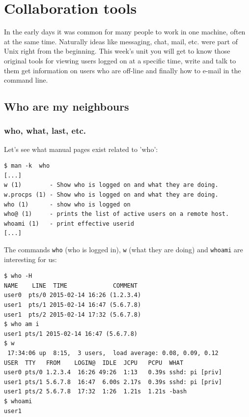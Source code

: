 \documentclass[11pt,a4paper,twoside]{article}
\begin{document}
\newpage

\section{Collaboration tools}

In the early days it was common for many people to work in one machine, 
often at the same time. Naturally ideas like messaging, chat, mail, etc. 
were part of Unix right from the beginning. This week's unit you will get 
to know those original tools for viewing users logged on at a specific
time, write and talk to them get information on users who are off-line
and finally how to e-mail in the command line.


\subsection{Who are my neighbours}

\subsubsection{who, what, last, etc.}

Let's see what manual pages exist related to 'who':

\begin{lstlisting}[frame=single]
$ man -k  who
[...]
w (1)        - Show who is logged on and what they are doing.
w.procps (1) - Show who is logged on and what they are doing.
who (1)      - show who is logged on
who@ (1)     - prints the list of active users on a remote host.
whoami (1)   - print effective userid
[...]
\end{lstlisting}

The commands \texttt{who} (who is logged in), \texttt{w} (what they are
doing) and \texttt{whoami} are interesting for us:

\begin{lstlisting}[frame=single]
$ who -H
NAME    LINE  TIME             COMMENT
user0  pts/0 2015-02-14 16:26 (1.2.3.4)
user1  pts/1 2015-02-14 16:47 (5.6.7.8)
user1  pts/2 2015-02-14 17:32 (5.6.7.8)
$ who am i
user1 pts/1 2015-02-14 16:47 (5.6.7.8)
$ w
 17:34:06 up  8:15,  3 users,  load average: 0.08, 0.09, 0.12
USER  TTY   FROM    LOGIN@  IDLE  JCPU   PCPU  WHAT
user0 pts/0 1.2.3.4  16:26 49:26  1:13   0.39s sshd: pi [priv]
user1 pts/1 5.6.7.8  16:47  6.00s 2.17s  0.39s sshd: pi [priv]
user1 pts/2 5.6.7.8  17:32  1:26  1.21s  1.21s -bash
$ whoami
user1
\end{lstlisting}
\end{document}
